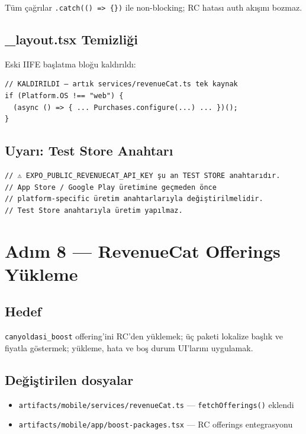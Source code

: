 \documentclass[12pt,a4paper]{article}
\begin{document}
Tüm çağrılar \texttt{.catch(() => \{\})} ile non-blocking; RC hatası auth akışını bozmaz.

\subsection{\_layout.tsx Temizliği}

Eski IIFE başlatma bloğu kaldırıldı:
\begin{lstlisting}[language={}]
// KALDIRILDI — artık services/revenueCat.ts tek kaynak
if (Platform.OS !== "web") {
  (async () => { ... Purchases.configure(...) ... })();
}
\end{lstlisting}

\subsection{Uyarı: Test Store Anahtarı}

\begin{lstlisting}[language={}]
// ⚠️ EXPO_PUBLIC_REVENUECAT_API_KEY şu an TEST STORE anahtarıdır.
// App Store / Google Play üretimine geçmeden önce
// platform-specific üretim anahtarlarıyla değiştirilmelidir.
// Test Store anahtarıyla üretim yapılmaz.
\end{lstlisting}

\section{Adım 8 — RevenueCat Offerings Yükleme}

\subsection{Hedef}

\texttt{canyoldasi\_boost} offering'ini RC'den yüklemek;
üç paketi lokalize başlık ve fiyatla göstermek;
yükleme, hata ve boş durum UI'larını uygulamak.

\subsection{Değiştirilen dosyalar}

\begin{itemize}[leftmargin=1.5em]
  \item \texttt{artifacts/mobile/services/revenueCat.ts} — \texttt{fetchOfferings()} eklendi
  \item \texttt{artifacts/mobile/app/boost-packages.tsx} — RC offerings entegrasyonu
\end{itemize}
\end{document}
